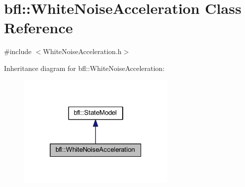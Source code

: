 \hypertarget{classbfl_1_1WhiteNoiseAcceleration}{}\section{bfl\+:\+:White\+Noise\+Acceleration Class Reference}
\label{classbfl_1_1WhiteNoiseAcceleration}


{\ttfamily \#include $<$White\+Noise\+Acceleration.\+h$>$}



Inheritance diagram for bfl\+:\+:White\+Noise\+Acceleration\+:
\nopagebreak
\begin{figure}[H]
\begin{center}
\leavevmode
\includegraphics[width=217pt]{classbfl_1_1WhiteNoiseAcceleration__inherit__graph}
\end{center}
\end{figure}
